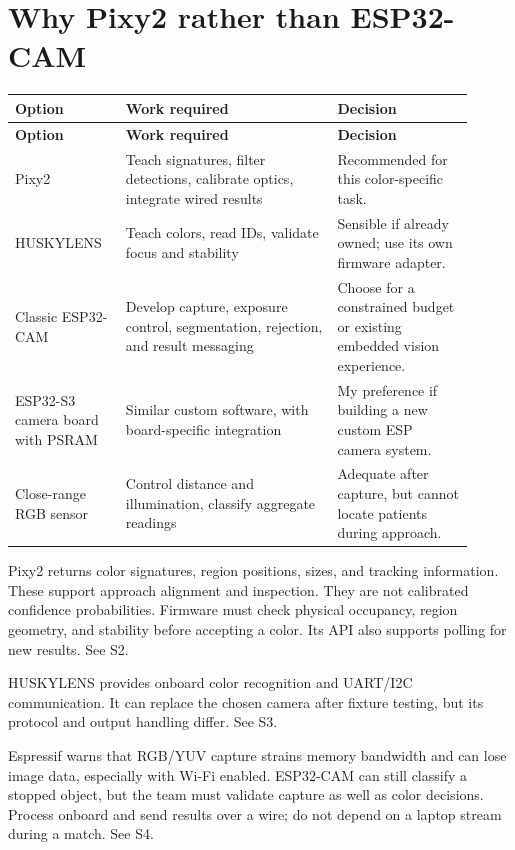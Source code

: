 \documentclass[10pt,a4paper]{article}
\begin{document}
\section{Why Pixy2 rather than ESP32-CAM}
\small\begin{longtable}{@{}>{\raggedright\arraybackslash}p{0.22\linewidth}>{\raggedright\arraybackslash}p{0.42\linewidth}>{\raggedright\arraybackslash}p{0.27\linewidth}@{}}
\toprule
\textbf{Option} & \textbf{Work required} & \textbf{Decision} \\
\midrule\endfirsthead
\toprule\textbf{Option} & \textbf{Work required} & \textbf{Decision} \\\midrule\endhead
Pixy2 & Teach signatures, filter detections, calibrate optics, integrate wired results & Recommended for this color-specific task. \\[3pt]
HUSKYLENS & Teach colors, read IDs, validate focus and stability & Sensible if already owned; use its own firmware adapter. \\[3pt]
Classic ESP32-CAM & Develop capture, exposure control, segmentation, rejection, and result messaging & Choose for a constrained budget or existing embedded vision experience. \\[3pt]
ESP32-S3 camera board with PSRAM & Similar custom software, with board-specific integration & My preference if building a new custom ESP camera system. \\[3pt]
Close-range RGB sensor & Control distance and illumination, classify aggregate readings & Adequate after capture, but cannot locate patients during approach. \\[3pt]
\bottomrule\end{longtable}\normalsize
Pixy2 returns color signatures, region positions, sizes, and tracking information. These support approach alignment and inspection. They are not calibrated confidence probabilities. Firmware must check physical occupancy, region geometry, and stability before accepting a color. Its API also supports polling for new results. See S2.

HUSKYLENS provides onboard color recognition and UART/I2C communication. It can replace the chosen camera after fixture testing, but its protocol and output handling differ. See S3.

Espressif warns that RGB/YUV capture strains memory bandwidth and can lose image data, especially with Wi-Fi enabled. ESP32-CAM can still classify a stopped object, but the team must validate capture as well as color decisions. Process onboard and send results over a wire; do not depend on a laptop stream during a match. See S4.
\end{document}
